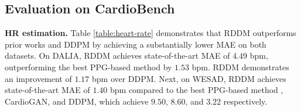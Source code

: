 \documentclass[letterpaper]{article} %
\begin{document}
\subsection{Evaluation on CardioBench}

\noindent\textbf{HR estimation. } Table \ref{table:heart-rate} demonstrates that RDDM outperforms prior works and DDPM by achieving a substantially lower MAE on both datasets. On DALIA, RDDM achieves state-of-the-art MAE of $4.49$ bpm, outperforming the best PPG-based method \cite{song2021ppg} by $1.53$ bpm. RDDM demonstrates an improvement of $1.17$ bpm over DDPM. Next, on WESAD, RDDM achieves state-of-the-art MAE of $1.40$ bpm compared to the best PPG-based method \cite{reiss2019deep}, CardioGAN, and DDPM, which achieve $9.50$, $8.60$, and $3.22$ respectively.

\begin{table}[t]
    \centering
    \small
    \setlength{\tabcolsep}{3pt}
    \caption{Evaluation of \textbf{Heart rate estimation.} RDDM outperforms the prior works by a significant margin.} 
    \label{table:heart-rate}
    \end{table}
    
\end{document}
